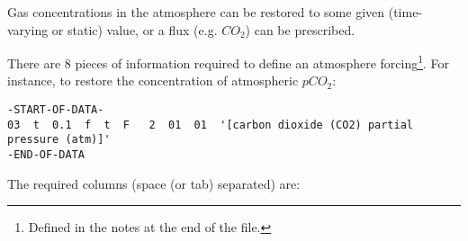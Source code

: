 \vspace{1mm}

Gas concentrations in the atmosphere can be restored to some given (time-varying or static) value, or a flux (e.g. \(CO_{2}\)) can be prescribed. 

There are 8 pieces of information required to define an atmosphere forcing\footnote{Defined in the notes at the end of the file.}. For instance, to restore the concentration of atmospheric \(pCO_{2}\):

\vspace{-2mm}\footnotesize\begin{verbatim}
-START-OF-DATA-
03  t  0.1  f  t  F   2  01  01  '[carbon dioxide (CO2) partial pressure (atm)]'
-END-OF-DATA
\end{verbatim}\normalsize\vspace{-2mm}

\noindent The required columns (space (or tab) separated) are:

